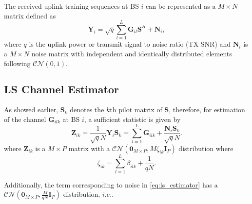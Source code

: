 \documentclass[journal,12pt,onecolumn]{IEEEtran}
\begin{document}
The received uplink training sequences at BS $i$ can be represented as a $M \times N$ matrix defined as
\begin{equation}\label{eq:received_signal}
\textbf{Y}_{i} = \sqrt{q} \sum^{L}_{l=1}{ \textbf{G}_{il} \textbf{S}^{H} + \textbf{N}_{i}},
\end{equation}
where $q$ is the uplink power or transmit signal to noise ratio (TX SNR) and $\textbf{N}_{i}$ is a $M \times N$ noise matrix with independent and identically distributed elements following $\mathcal{CN}(0,1)$.

\subsection{LS Channel Estimator}

As showed earlier, $\textbf{S}_{k}$ denotes the $k$th pilot matrix of $\textbf{S}$, therefore, for estimation of the channel $\textbf{G}_{ilk}$ at BS $i$, a sufficient statistic is given by 
\begin{equation}\label{eq:ls_estimator}
\textbf{Z}_{ik} = \frac{1}{\sqrt{q}N} \textbf{Y}_{i} \textbf{S}_{k} = \sum_{l=1}^{L}{\textbf{G}_{ilk}} + \frac{\textbf{N}_{i}\textbf{S}_{k}}{\sqrt{q}N}.
\end{equation}
where $\textbf{Z}_{ik}$ is a $M \times P$ matrix with a $\mathcal{CN}(\textbf{0}_{M \times P},M\zeta_{ik}\textbf{I}_{P})$ distribution where
\begin{equation}\label{eq:zeta}
\zeta_{ik} = \sum_{l=1}^{L}{\beta_{ilk}} +  \frac{1}{qN}.
\end{equation}

Additionally, the term corresponding to noise in \eqref{eq:ls_estimator} has a $\mathcal{CN}(\textbf{0}_{M \times P},\frac{M}{qN}\textbf{I}_{P})$ distribution, $i.e.$.%
\end{document}
